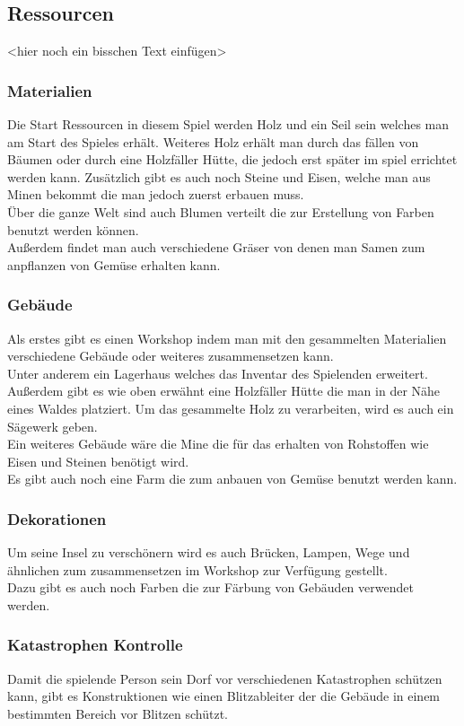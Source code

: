 \documentclass[paper=A4,pagesize=auto,12pt,headinclude=true,footinclude=true,BCOR=0mm,DIV=calc]{scrartcl}
\newcommand{\sectionspace}{
	\vspace{0.5cm}
}
\begin{document}
\sectionspace
\subsection{Ressourcen}\label{sec:Ressourcen}
<hier noch ein bisschen Text einfügen>

\subsubsection{Materialien}
Die Start Ressourcen in diesem Spiel werden Holz und ein Seil sein welches man am Start des Spieles erhält. Weiteres Holz erhält man durch das fällen von Bäumen oder durch eine Holzfäller Hütte, die jedoch erst später im spiel errichtet werden kann. Zusätzlich gibt es auch noch Steine und Eisen, welche man aus Minen bekommt die man jedoch zuerst erbauen muss.\\
Über die ganze Welt sind auch Blumen verteilt die zur Erstellung von Farben benutzt werden können.\\
Außerdem findet man auch verschiedene Gräser von denen man Samen zum anpflanzen von Gemüse erhalten kann. 

\subsubsection{Gebäude}
Als erstes gibt es einen Workshop indem man mit den gesammelten Materialien verschiedene Gebäude oder weiteres zusammensetzen kann.\\
Unter anderem ein Lagerhaus welches das Inventar des Spielenden erweitert. Außerdem gibt es wie oben erwähnt eine Holzfäller Hütte die man in der Nähe eines Waldes platziert. Um das gesammelte Holz zu verarbeiten, wird es auch ein Sägewerk geben.\\
Ein weiteres Gebäude wäre die Mine die für das erhalten von Rohstoffen wie Eisen und Steinen benötigt wird.\\
Es gibt auch noch eine Farm die zum anbauen von Gemüse benutzt werden kann.

\subsubsection{Dekorationen}
Um seine Insel zu verschönern wird es auch Brücken, Lampen, Wege und ähnlichen zum zusammensetzen im Workshop zur Verfügung gestellt.\\
Dazu gibt es auch noch Farben die zur Färbung von Gebäuden verwendet werden.

\subsubsection{Katastrophen Kontrolle}
Damit die spielende Person sein Dorf vor verschiedenen Katastrophen schützen kann, gibt es Konstruktionen wie einen Blitzableiter der die Gebäude in einem bestimmten Bereich vor Blitzen schützt.
\end{document}
